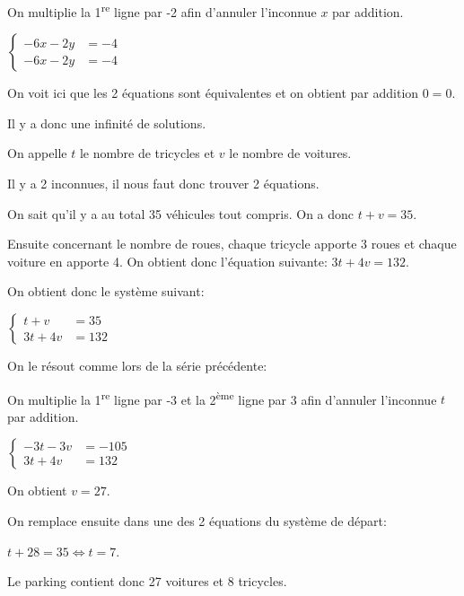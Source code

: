 \documentclass[a4paper,12pt]{scrartcl}
\begin{document}
On multiplie la 1\textsuperscript{re} ligne par -2 afin d'annuler l'inconnue $x$ par addition.

$
\begin{cases}
-6x-2y &= -4\\ 
-6x-2y &= -4
\end{cases}$

On voit ici que les 2 équations sont équivalentes et on obtient par addition $0=0$. 

Il y a donc une infinité de solutions.





On appelle $t$ le nombre de tricycles et $v$ le nombre de voitures.

Il y a 2 inconnues, il nous faut donc trouver 2 équations. 

On sait qu'il y a au total 35 véhicules tout compris. On a donc $t+v = 35$.

Ensuite concernant le nombre de roues, chaque tricycle apporte 3 roues et chaque voiture en apporte 4. On obtient donc l'équation suivante: $3t + 4v = 132$.

On obtient donc le système suivant:

$
\begin{cases}
t+v &= 35\\ 
3t + 4v &= 132
\end{cases}$

On le résout comme lors de la série précédente: 

On multiplie la 1\textsuperscript{re} ligne par -3 et la 2\textsuperscript{ème} ligne par 3 afin d'annuler l'inconnue $t$ par addition.

$
\begin{cases}
-3t-3v &= -105\\ 
3t + 4v &= 132
\end{cases}$

On obtient $v = 27$.

On remplace ensuite dans une des 2 équations du système de départ:

$t + 28 = 35 \Leftrightarrow t = 7$.

Le parking contient donc 27 voitures et 8 tricycles.


\end{document}

